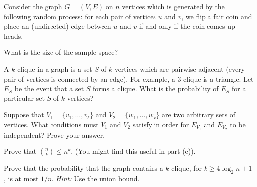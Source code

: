 \documentclass[11pt]{article}
\begin{document}

Consider the graph $G = (V,E)$ on $n$ vertices which is generated by the following 
random process: for each pair of vertices $u$ and $v$, we flip a fair coin and 
place an (undirected) edge between $u$ and $v$ if and only if the coin comes up 
heads.

\begin{Parts}
\Part What is the size of the sample space?

\Part A $k$-clique in a graph is a set $S$ of $k$ vertices which are pairwise 
adjacent (every pair of vertices is connected by an edge). For example, a 
$3$-clique is a triangle. Let $E_S$ be the event that a set $S$ forms a clique. 
What is the probability of $E_S$ for a particular set $S$ of $k$ vertices? 

\Part Suppose that $V_1 = \{v_1, \dots, v_{\ell}\}$ and $V_2 = \{w_1, \dots, 
w_k\}$ are two arbitrary sets of vertices. What conditions must $V_1$ and $V_2$ 
satisfy in order for $E_{V_1}$ and $E_{V_2}$ to be independent? Prove your answer.

\Part Prove that $\binom{n}{k} \le n^k$. (You might find this useful in part (e)).

\Part Prove that the probability that the graph contains a $k$-clique, for $k 
\geq 4{\log_2 n}+1$, is at most $1/n$. \textit{Hint:} Use the union bound.
\end{Parts}
\end{document}
